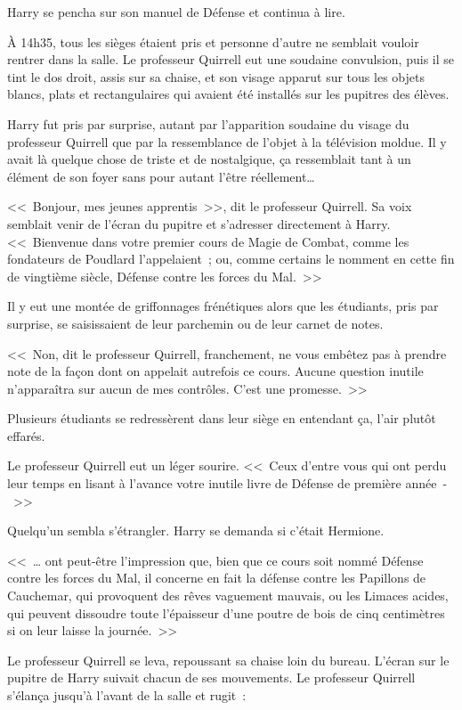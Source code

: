 Harry se pencha sur son manuel de Défense et continua à lire.

\later

À 14h35, tous les sièges étaient pris et personne d'autre ne semblait vouloir rentrer dans la salle. Le professeur Quirrell eut une soudaine convulsion, puis il se tint le dos droit, assis sur sa chaise, et son visage apparut sur tous les objets blancs, plats et rectangulaires qui avaient été installés sur les pupitres des élèves.

Harry fut pris par surprise, autant par l'apparition soudaine du visage du professeur Quirrell que par la ressemblance de l'objet à la télévision moldue. Il y avait là quelque chose de triste et de nostalgique, ça ressemblait tant à un élément de son foyer sans pour autant l'être réellement…

<<~Bonjour, mes jeunes apprentis~>>, dit le professeur Quirrell. Sa voix semblait venir de l'écran du pupitre et s'adresser directement à Harry. <<~Bienvenue dans votre premier cours de Magie de Combat, comme les fondateurs de Poudlard l'appelaient~; ou, comme certains le nomment en cette fin de vingtième siècle, Défense contre les forces du Mal.~>>

Il y eut une montée de griffonnages frénétiques alors que les étudiants, pris par surprise, se saisissaient de leur parchemin ou de leur carnet de notes.

<<~Non, dit le professeur Quirrell, franchement, ne vous embêtez pas à prendre note de la façon dont on appelait autrefois ce cours. Aucune question inutile n'apparaîtra sur aucun de mes contrôles. C'est une promesse.~>>

Plusieurs étudiants se redressèrent dans leur siège en entendant ça, l'air plutôt effarés.

Le professeur Quirrell eut un léger sourire. <<~Ceux d'entre vous qui ont perdu leur temps en lisant à l'avance votre inutile livre de Défense de première année~-~>>

Quelqu'un sembla s'étrangler. Harry se demanda si c'était Hermione.

<<~… ont peut-être l'impression que, bien que ce cours soit nommé Défense contre les forces du Mal, il concerne en fait la défense contre les Papillons de Cauchemar, qui provoquent des rêves vaguement mauvais, ou les Limaces acides, qui peuvent dissoudre toute l'épaisseur d'une poutre de bois de cinq centimètres si on leur laisse la journée.~>>

Le professeur Quirrell se leva, repoussant sa chaise loin du bureau. L'écran sur le pupitre de Harry suivait chacun de ses mouvements. Le professeur Quirrell s'élança jusqu'à l'avant de la salle et rugit~:

